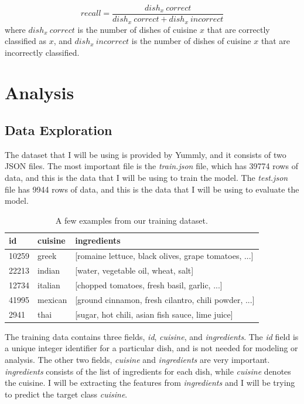 \documentclass[12pt]{article}
\begin{document}
\begin{equation}
recall = \frac{\textit{$dish_x\: correct$}}{\textit{$dish_x\: correct$} + \textit{$dish_x\: incorrect$}}
\end{equation}
%
where $dish_x\: correct$ is the number of dishes of cuisine $x$ that are correctly classified as $x$, and $dish_x\: incorrect$ is the number of dishes of cuisine $x$ that are incorrectly classified.

\section{Analysis}
\subsection{Data Exploration}
The dataset that I will be using is provided by Yummly, and it consists of two JSON files. The most important file is the \textit{train.json} file, which has 39774 rows of data, and this is the data that I will be using to train the model. The \textit{test.json} file has 9944 rows of data, and this is the data that I will be using to evaluate the model.

\begin{table}[H]
\centering
\begin{tabular}{|l|l|l|}
\hline
\textbf{id} & \textbf{cuisine} & \textbf{ingredients}                                     \\ \hline
10259       & greek            & {[}romaine lettuce, black olives, grape tomatoes, ...{]} \\ \hline
22213       & indian           & {[}water, vegetable oil, wheat, salt{]}                  \\ \hline
12734       & italian          & {[}chopped tomatoes, fresh basil, garlic, ...{]}         \\ \hline
41995       & mexican          & {[}ground cinnamon, fresh cilantro, chili powder, ...{]} \\ \hline
2941        & thai             & {[}sugar, hot chili, asian fish sauce, lime juice{]}     \\ \hline
\end{tabular}
\caption{A few examples from our training dataset.}
\end{table}

\noindent
The training data contains three fields, \textit{id}, \textit{cuisine}, and \textit{ingredients}. The \textit{id} field is a unique integer identifier for a particular dish, and is not needed for modeling or analysis. The other two fields, \textit{cuisine} and \textit{ingredients}  are very important. \textit{ingredients} consists of the list of ingredients for each dish, while \textit{cuisine} denotes the cuisine. I will be extracting the features from \textit{ingredients} and I will be trying to predict the target class \textit{cuisine}.
\end{document}
